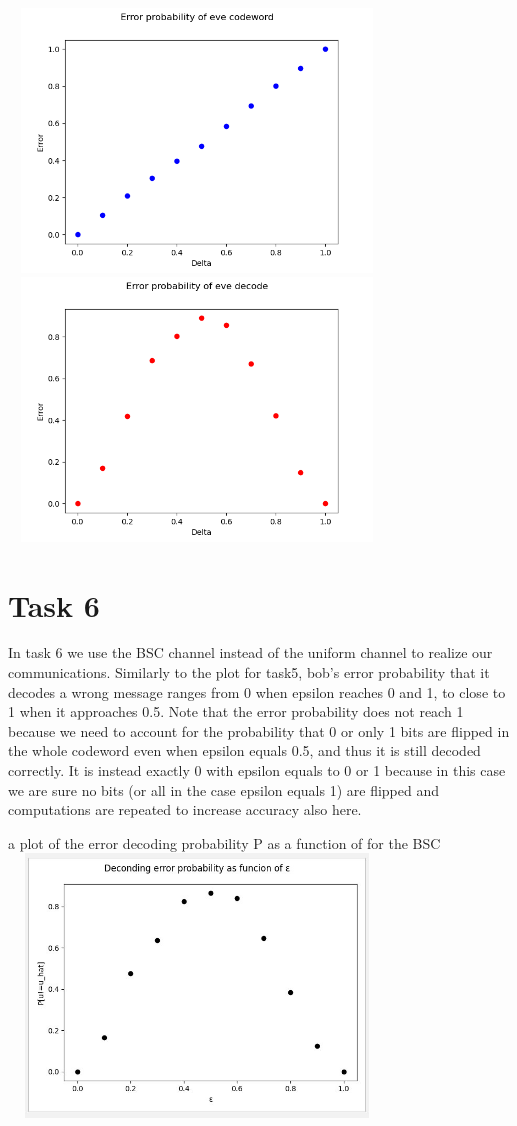 \documentclass{report}
\begin{document}
 \includegraphics[width=10cm,height=7cm]{5}
  \includegraphics[width=10cm,height=7cm]{6}

\section*{Task 6}
 
 In task 6 we use the BSC channel instead of the uniform channel to realize our communications.
Similarly to the plot for task5, bob's error probability that it decodes a wrong message ranges from 0 when epsilon reaches 0 and 1, to close to 1 when it approaches 0.5.
Note that the error probability does not reach 1 because we need to account for the probability that 0 or only 1 bits are flipped in the whole codeword even when epsilon equals 0.5, and thus it is still decoded correctly.
It is instead exactly 0 with epsilon equals to 0 or 1 because in this case we are sure no bits (or all in the case epsilon equals 1) are flipped and computations are repeated to increase accuracy also here.
\hfill \break \linebreak

a plot of the error decoding probability P as a function of \textepsilon \space for the BSC
\includegraphics[width=10cm,height=7cm]{10}
\end{document}
